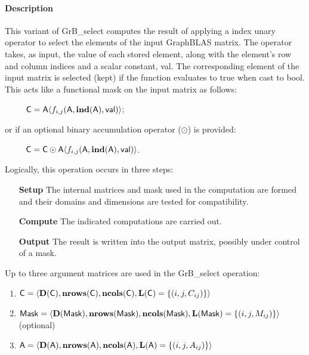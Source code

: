 \paragraph{Description}

{\color{red}
This variant of {\sf GrB\_select} computes the result of applying a index unary operator
to select the elements of the input GraphBLAS matrix.  The operator takes, as input,
the value of each stored element, along with the element's row and column indices and a scalar 
constant, {\sf val}.  The corresponding element of the input matrix is selected (kept)
if the function evaluates to {\sf true} when cast to {\sf bool}.  This acts like a
functional mask on the input matrix as follows:
\begin{itemize}[leftmargin=2.1in]
\item[~] ${\sf C} = {\sf A}\langle f_{i,j}({\sf A}, \bold{ind}({\sf A}), {\sf val})\rangle$;
\end{itemize}
or if an optional binary accumulation operator ($\odot$) is provided:  
\begin{itemize}[leftmargin=2.1in]
\item[~] ${\sf C} = {\sf C} \odot {\sf A}\langle f_{i,j}({\sf A}, \bold{ind}({\sf A}), {\sf val})\rangle$.  
\end{itemize}
}

Logically, this operation occurs in three steps:
\begin{enumerate}[leftmargin=0.85in]
\item[\bf Setup] The internal matrices and mask used in the computation are formed 
and their domains and dimensions are tested for compatibility.
\item[\bf Compute] The indicated computations are carried out.
\item[\bf Output] The result is written into the output matrix, possibly under 
control of a mask.
\end{enumerate}

Up to three argument matrices are used in the {\sf GrB\_select} operation:
\begin{enumerate}
    \item ${\sf C} = \langle \bold{D}({\sf C}),\bold{nrows}({\sf C}),
    \bold{ncols}({\sf C}),\bold{L}({\sf C}) = \{(i,j,C_{ij}) \} \rangle$

    \item ${\sf Mask} = \langle \bold{D}({\sf Mask}),\bold{nrows}({\sf Mask}),
    \bold{ncols}({\sf Mask}),\bold{L}({\sf Mask}) = \{(i,j,M_{ij}) \} \rangle$ (optional)

    \item ${\sf A} = \langle \bold{D}({\sf A}),\bold{nrows}({\sf A}),
    \bold{ncols}({\sf A}),\bold{L}({\sf A}) = \{(i,j,A_{ij}) \} \rangle$
\end{enumerate}

